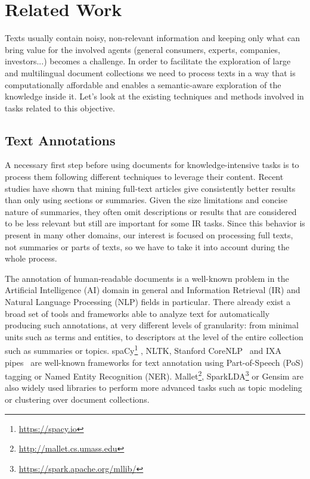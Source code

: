 

\chapter{Related Work}\label{ch:soa}

\graphicspath{{soa/figures/}}


Texts usually contain noisy, non-relevant information and keeping only what can bring value for the involved agents (general consumers, experts, companies, investors...) becomes a challenge. In order to facilitate the exploration of large and multilingual document collections we need to process texts in a way that is computationally affordable and enables a semantic-aware exploration of the knowledge inside it. Let's look at the existing techniques and methods involved in tasks related to this objective. 


\section{Text Annotations}

A necessary first step before using documents for knowledge-intensive tasks is to process them following different techniques to leverage their content. Recent studies \cite{Westergaard2017}\cite{Sciences2016} have shown that mining full-text articles give consistently better results than only using sections or summaries. Given the size limitations and concise nature of summaries, they often omit descriptions or results that are considered to be less relevant but still are important for some IR tasks\cite{Divoli2012}.  Since this behavior is present in many other domains, our interest is focused on processing full texts, not summaries or parts of texts, so we have to take it into account during the whole process.

The annotation of human-readable documents is a well-known problem in the Artificial Intelligence (AI) domain in general and Information Retrieval (IR) and Natural Language Processing (NLP) fields in particular. There already exist a broad set of tools and frameworks able to analyze text for automatically producing such annotations, at very different levels of granularity: from minimal units such as terms and entities, to descriptors at the level of the entire collection such as  summaries or topics. spaCy\footnote{\url{https://spacy.io}} , NLTK, Stanford CoreNLP~\cite{Manning2014TheToolkit} and IXA pipes~\cite{Agerri2014} are well-known frameworks for text annotation using Part-of-Speech (PoS) tagging or Named Entity Recognition (NER). Mallet\footnote{\url{http://mallet.cs.umass.edu}},  SparkLDA\footnote{\url{https://spark.apache.org/mllib/}} or Gensim are also widely used libraries to perform more advanced tasks such as topic modeling or clustering over document collections. 

